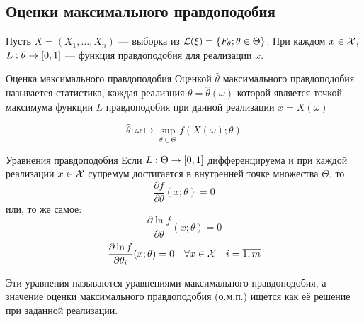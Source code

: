 \subsection{Оценки максимального правдоподобия}

Пусть $X=(X_1,\dotsc,X_n)$ --- выборка из $\mathcal L(\xi) = \{ F_\theta; \theta\in\Theta \}$.
При каждом $x\in\mathcal X$, $L:\theta\to\left[{0, 1}\right]$ --- функция правдоподобия для реализации $x$.

\begin{dfn}{Оценка максимального правдоподобия}
Оценкой $\hat\theta$ максимального правдоподобия
называется статистика, каждая реализция $\theta=\hat\theta(\omega)$ которой
является точкой максимума функции $L$ правдоподобия при данной реализации $x=X(\omega)$

$$\hat\theta:\omega\mapsto\sup_{\theta\in\Theta} f(X(\omega);\theta)$$
\end{dfn}

\begin{thm}{Уравнения правдоподобия}
Если $L:\Theta\to\left[{0, 1}\right]$ дифференцируема
и при каждой реализации $x\in\mathcal X$
супремум достигается в внутренней точке множества $\Theta$,
то $$\frac{\partial f}{\partial\theta}(x;\theta) = 0$$
или, то же самое: $$\frac{\partial\ln f}{\partial\theta}(x;\theta) = 0$$
$$\frac{\partial\ln f}{\partial\theta_i}(x;\theta) = 0
 \quad \forall x\in\mathcal X\quad i=\overline{1,m}$$

Эти уравнения называются уравнениями максимального правдоподобия,
а значение оценки максимального правдоподобия (о.м.п.) ищется как её решение
при заданной реализации.
\end{thm}
